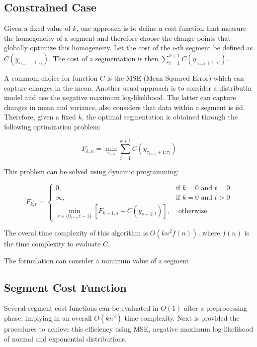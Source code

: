 \subsection{Constrained Case}

Given a fixed value of $k$, one approach is to define a cost function that measure the homogeneity of a segment and therefore choose the change points that globally optimize this homogeneity. Let the cost of the $i$-th segment be defined as $C(y_{\tau_{i - 1} + 1 : \tau_{i}})$. The cost of a segmentation is then $\sum \limits_{i = 1}^{k + 1} C(y_{\tau_{i - 1} + 1 : \tau_{i}})$.

A commom choice for function $C$ is the MSE (Mean Squared Error) which can capture changes in the mean. Another usual approach is to consider a distributin model and use the negative maximum log-likelihood. The latter can capture changes in mean and variance, also considers that data within a segment is iid. Therefore, given a fixed $k$, the optimal segmentation is obtained through the following optimization problem: 

\begin{equation}
    F_{k, n} = \min_{\boldsymbol \tau_{1 : k}} \sum \limits_{i = 1}^{k + 1} C(y_{\tau_{i - 1} + 1 : \tau_{i}})
\end{equation}

This problem can be solved using dynamic programming:

\begin{equation}
    F_{k, t} = 
    \begin{cases}
        0, & \text{if } k = 0 \text{ and } t = 0 \\
        \infty, & \text{if } k = 0 \text{ and } t > 0 \\
        \displaystyle \min_{s \in \{0, ..., t - 1\}} \left[ F_{k - 1, s} + C(y_{s + 1 : t}) \right], & \text{ otherwise}
    \end{cases}
\end{equation}

The overal time complexity of this algorithm is $O(k n^2 f(n))$, where $f(n)$ is the time complexity to evaluate $C$.

The formulation can consider a minimum value of a segment

\subsection{Segment Cost Function}

Several segment cost functions can be evaluated in $O(1)$ after a preprocessing phase, implying in an overall $O(k n^2)$ time complexity. Next is provided the procedures to achieve this efficiency using MSE, negative maximum log-likelihood of normal and exponential distributions.

